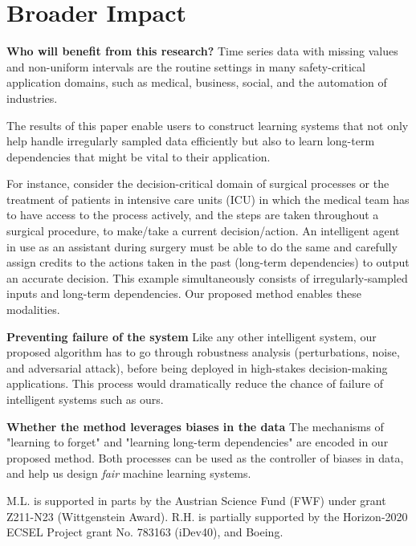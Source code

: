 \documentclass{article}
\begin{document}
\section*{Broader Impact}

\textbf{Who will benefit from this research?   }
Time series data with missing values and non-uniform intervals are the routine settings in many safety-critical application domains, such as medical, business, social, and the automation of industries.

The results of this paper enable users to construct learning systems that not only help handle irregularly sampled data efficiently but also to learn long-term dependencies that might be vital to their application. 

For instance, consider the decision-critical domain of surgical processes or the treatment of patients in intensive care units (ICU) in which the medical team has to have access to the process actively, and the steps are taken throughout a surgical procedure, to make/take a current decision/action. An intelligent agent in use as an assistant during surgery must be able to do the same and carefully assign credits to the actions taken in the past (long-term dependencies) to output an accurate decision. This example simultaneously consists of irregularly-sampled inputs and long-term dependencies. Our proposed method enables these modalities. 

\textbf{Preventing failure of the system   } Like any other intelligent system, our proposed algorithm has to go through robustness analysis (perturbations, noise, and adversarial attack), before being deployed in high-stakes decision-making applications. This process would dramatically reduce the chance of failure of intelligent systems such as ours. 
 
\textbf{Whether the method leverages biases in the data   } The mechanisms of "learning to forget" and "learning long-term dependencies" are encoded in our proposed method. Both processes can be used as the controller of biases in data, and help us design \emph{fair} machine learning systems. 


\begin{ack}
M.L. is supported in parts by the Austrian Science Fund (FWF) under grant Z211-N23 (Wittgenstein Award). R.H. is partially supported by the Horizon-2020 ECSEL Project grant No. 783163 (iDev40), and Boeing.
\end{ack}





\end{document}
